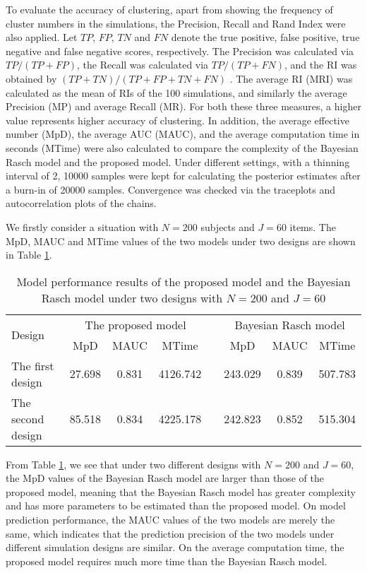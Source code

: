 \documentclass[12pt]{article}
\begin{document}
To evaluate the accuracy of clustering, apart from showing the frequency of cluster numbers in the simulations, the Precision, Recall and Rand Index \citep[RI;][]{rand1971objective} were also applied. 
Let $TP$, $FP$, $TN$ and $FN$ denote the true positive, false positive, true negative and false negative scores, respectively. The Precision was calculated via $TP/(TP+FP)$, the Recall was calculated via $TP/(TP+FN)$, and the RI was obtained by $(TP+TN)/(TP+FP+TN+FN)$ \citep{ma2019bayesianspatial}. 
The average RI (MRI) was calculated as the mean of RIs of the 100 simulations, and similarly the average Precision (MP) and average Recall (MR). For both these three measures, a higher value represents higher accuracy of clustering. 
In addition, the average effective number (MpD), the average AUC (MAUC), and the average computation time in seconds (MTime) were also calculated to compare the complexity of the Bayesian Rasch model and the proposed model. 
Under different settings, with a thinning interval of 2, 10000 samples were kept for calculating the posterior estimates after a burn-in of 20000 samples. Convergence was checked via the traceplots and autocorrelation plots of the chains. 

We firstly consider a situation with $N=200$ subjects and $J=60$ items. 
The MpD, MAUC and MTime values of the two models under two designs are shown in Table \ref{tab:mpd}. 

\begin{table}[h!]
	\centering
	\caption{Model performance results of the proposed model and the Bayesian Rasch model under two designs with $N=200$ and $J=60$}\label{tab:mpd}
	\begin{tabular}{lccccccc}
		\toprule
		\multirow{2}{*}{Design} & \multicolumn{3}{c}{The proposed model } && \multicolumn{3}{c}{Bayesian Rasch model} \\
		\cline{2-4} \cline{6-8}
		& MpD & MAUC & MTime & & MpD & MAUC & MTime\\
		\midrule 
		The first design & 27.698 & 0.831 & 4126.742 & & 243.029 &0.839  & 507.783 \\
		The second design & 85.518 &0.834 & 4225.178& &242.823&0.852 & 515.304\\
		\bottomrule
	\end{tabular}
\end{table} 

From Table \ref{tab:mpd}, we see that under two different designs with $N=200$ and $J=60$, the MpD values of the Bayesian Rasch model are larger than those of the proposed model, meaning that the Bayesian Rasch model has greater complexity and has more parameters to be estimated than the proposed model. On model prediction performance, the MAUC values of the two models are merely the same, which indicates that the prediction precision of the two models under different simulation designs are similar. On the average computation time, the proposed model requires much more time than the Bayesian Rasch model. 
\end{document}
